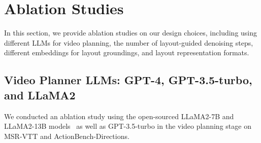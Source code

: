 \begin{table}[h]
\begin{center}
\end{center}
\caption{Step-wise error analysis of \method{} video generation pipeline on HiREST prompts.
We use a Likert scale (1-5) to rate the accuracy of the generated components at each step.
}
\label{table:error_analysis}
\end{table}









\section{Ablation Studies}
\label{sec:ablation_study}



In this section, we provide ablation studies on our design choices,
including using different LLMs for video planning, the number of layout-guided denoising steps,
different embeddings for layout groundings, and layout representation formats.




\subsection{Video Planner LLMs: GPT-4, GPT-3.5-turbo, and LLaMA2}







We conducted an ablation study using the open-sourced LLaMA2-7B and LLaMA2-13B models~\citep{touvron2023llama} as well as GPT-3.5-turbo in the video planning stage on MSR-VTT and ActionBench-Directions. 

